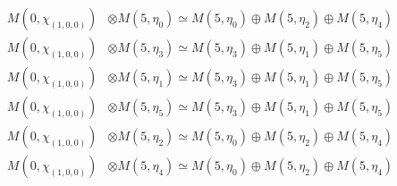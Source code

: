 \begin{align*}
M(0,\chi_{(1,0,0)}) &\otimes M(5,\eta_{0}) \simeq M(5,\eta_{0}) \oplus M(5,\eta_{2}) \oplus M(5,\eta_{4})\\
M(0,\chi_{(1,0,0)}) &\otimes M(5,\eta_{3}) \simeq M(5,\eta_{3}) \oplus M(5,\eta_{1}) \oplus M(5,\eta_{5})\\
M(0,\chi_{(1,0,0)}) &\otimes M(5,\eta_{1}) \simeq M(5,\eta_{3}) \oplus M(5,\eta_{1}) \oplus M(5,\eta_{5})\\
M(0,\chi_{(1,0,0)}) &\otimes M(5,\eta_{5}) \simeq M(5,\eta_{3}) \oplus M(5,\eta_{1}) \oplus M(5,\eta_{5})\\
M(0,\chi_{(1,0,0)}) &\otimes M(5,\eta_{2}) \simeq M(5,\eta_{0}) \oplus M(5,\eta_{2}) \oplus M(5,\eta_{4})\\
M(0,\chi_{(1,0,0)}) &\otimes M(5,\eta_{4}) \simeq M(5,\eta_{0}) \oplus M(5,\eta_{2}) \oplus M(5,\eta_{4})\\
\end{align*}

